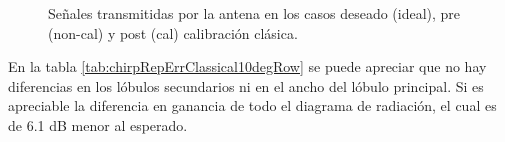 \begin{figure}[H]
	\centering

	\caption{Señales transmitidas por la antena en los casos deseado (ideal), pre (non-cal) y post (cal) calibración clásica.}
	\label{fig:chirpRepErrClassical10degRow}
\end{figure}

En la tabla \ref{tab:chirpRepErrClassical10degRow} se puede apreciar que no hay diferencias en los lóbulos secundarios ni en el
ancho del lóbulo principal. Si es apreciable la diferencia en ganancia de todo el diagrama de radiación, el cual es de 6.1 dB
menor al esperado.

